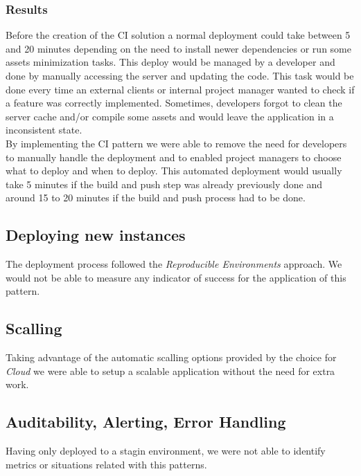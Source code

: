 					\subsubsection{Results}
					Before the creation of the CI solution a normal deployment could take between 5 and 20 minutes depending on the need to install newer dependencies or run some assets minimization tasks. This deploy would be managed by a developer and done by manually accessing the server and updating the code. This task would be done every time an external clients or internal project manager wanted to check if a feature was correctly implemented. Sometimes, developers forgot to clean the server cache and/or compile some assets and would leave the application in a inconsistent state. \\
					By implementing the CI pattern we were able to remove the need for developers to manually handle the deployment and to enabled project managers to choose what to deploy and when to deploy. This automated deployment would usually take 5 minutes if the build and push step was already previously done and around 15 to 20 minutes if the build and push process  had to be done.
			\subsection{Deploying new instances}
					The deployment process followed the \textit{Reproducible Environments} approach. We would not be able to measure any indicator of success for the application of this pattern.
			\subsection{Scalling}
					Taking advantage of the automatic scalling options provided by the choice for \textit{Cloud} we were able to setup a scalable application without the need for extra work.
			\subsection{Auditability, Alerting, Error Handling}
					Having only deployed to a stagin environment, we were not able to identify metrics or situations related with this patterns.
